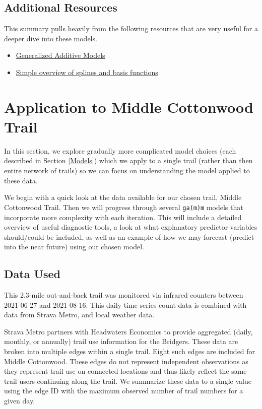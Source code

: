 \documentclass[
]{book}
\providecommand{\tightlist}{%
  \setlength{\itemsep}{0pt}\setlength{\parskip}{0pt}}
\begin{document}
\hypertarget{additional-resources}{%
\section{Additional Resources}\label{additional-resources}}

This summary pulls heavily from the following resources that are very
useful for a deeper dive into these models.

\begin{itemize}
\tightlist
\item
  \href{https://m-clark.github.io/generalized-additive-models/}{Generalized Additive
  Models}
\item
  \href{https://asbates.rbind.io/2019/02/04/what-are-splines/}{Simple overview of splines and basis
  functions}
\end{itemize}

\hypertarget{MidCot}{%
\chapter{Application to Middle Cottonwood Trail}\label{MidCot}}

In this section, we explore gradually more complicated model choices (each described in Section \ref{Models}) which we apply to a single trail (rather than then entire network of trails) so we can focus on understanding the model applied to these data.

We begin with a quick look at the data available for our chosen trail, Middle Cottonwood Trail. Then we will progress through several \texttt{ga(m)m} models that incorporate more complexity with each iteration. This will include a detailed overview of useful diagnostic tools, a look at what explanatory predictor variables should/could be included, as well as an example of how we may forecast (predict into the near future) using our chosen model.

\hypertarget{data-used}{%
\section{Data Used}\label{data-used}}

This 2.3-mile out-and-back trail was monitored via infrared counters between 2021-06-27 and 2021-08-16. This daily time series count data is combined with data from Strava Metro, and local weather data.

Strava Metro partners with Headwaters Economics to provide aggregated (daily, monthly, or annually) trail use information for the Bridgers. These data are broken into multiple edges within a single trail. Eight such edges are included for Middle Cottonwood. These edges do not represent independent observations as they represent trail use on connected locations and thus likely reflect the same trail users continuing along the trail. We summarize these data to a single value using the edge ID with the maximum observed number of trail numbers for a given day.
\end{document}
